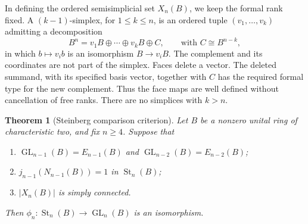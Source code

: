 \documentclass[11pt]{amsart}
\DeclareMathOperator{\GL}{GL}
\DeclareMathOperator{\St}{St}
\newtheorem{theorem}{Theorem}[section]
\theoremstyle{definition}
\theoremstyle{remark}
\numberwithin{equation}{section}
\begin{document}
In defining the ordered semisimplicial set $X_n(B)$, we keep the formal rank fixed. A $(k-1)$-simplex, for $1\leq k\leq n$, is an ordered tuple $(v_1,\ldots,v_k)$ admitting a decomposition
$$
B^n=v_1B\oplus\cdots\oplus v_kB\oplus C,\qquad\text{with }C\cong B^{n-k},
$$
in which $b\mapsto v_i b$ is an isomorphism $B\to v_iB$. The complement and its coordinates are not part of the simplex. Faces delete a vector. The deleted summand, with its specified basis vector, together with $C$ has the required formal type for the new complement. Thus the face maps are well defined without cancellation of free ranks. There are no simplices with $k>n$.

\begin{theorem}[Steinberg comparison criterion]
\label{thm:raw-criterion}
Let $B$ be a nonzero unital ring of characteristic two, and fix $n\geq4$. Suppose that
\begin{enumerate}
\item $\GL_{n-1}(B)=E_{n-1}(B)$ and $\GL_{n-2}(B)=E_{n-2}(B)$;
\item $j_{n-1}(N_{n-1}(B))=1$ in $\St_n(B)$;
\item $|X_n(B)|$ is simply connected.
\end{enumerate}
Then $\phi_n:\St_n(B)\to\GL_n(B)$ is an isomorphism.
\end{theorem}
\end{document}
